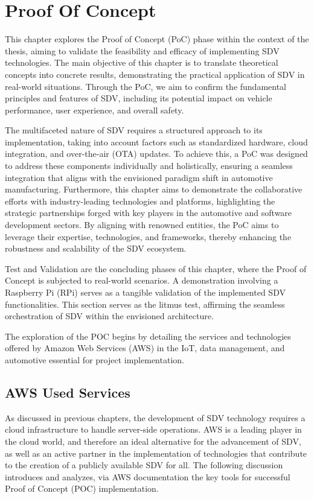 
\chapter{Proof Of Concept} \label{ch:proofOfConcept}

This chapter explores the Proof of Concept (PoC) phase within the context of the thesis, aiming to validate the feasibility and efficacy of implementing SDV technologies. The main objective of this chapter is to translate theoretical concepts into concrete results, demonstrating the practical application of SDV in real-world situations. Through the PoC, we aim to confirm the fundamental principles and features of SDV, including its potential impact on vehicle performance, user experience, and overall safety.

The multifaceted nature of SDV requires a structured approach to its implementation, taking into account factors such as standardized hardware, cloud integration, and over-the-air (OTA) updates. To achieve this, a PoC was designed to address these components individually and holistically, ensuring a seamless integration that aligns with the envisioned paradigm shift in automotive manufacturing. Furthermore, this chapter aims to demonstrate the collaborative efforts with industry-leading technologies and platforms, highlighting the strategic partnerships forged with key players in the automotive and software development sectors. By aligning with renowned entities, the PoC aims to leverage their expertise, technologies, and frameworks, thereby enhancing the robustness and scalability of the SDV ecosystem.

Test and Validation are the concluding phases of this chapter, where the Proof of Concept is subjected to real-world scenarios. A demonstration involving a Raspberry Pi (RPi) serves as a tangible validation of the implemented SDV functionalities. This section serves as the litmus test, affirming the seamless orchestration of SDV within the envisioned architecture.

The exploration of the POC begins by detailing the services and technologies offered by Amazon Web Services (AWS) in the IoT, data management, and automotive essential for project implementation.

\section{AWS Used Services}
As discussed in previous chapters, the development of SDV technology requires a cloud infrastructure to handle server-side operations. AWS is a leading player in the cloud world, and therefore an ideal alternative for the advancement of SDV, as well as an active partner in the implementation of technologies that contribute to the creation of a publicly available SDV for all. The following discussion introduces and analyzes, via AWS documentation the key tools for successful Proof of Concept (POC) implementation.

